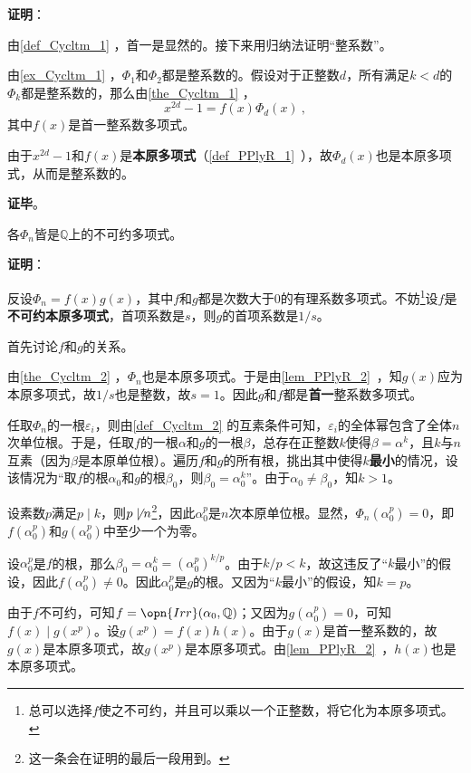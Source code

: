 \textbf{证明}：

由\autoref{def_Cycltm_1} ，首一是显然的。接下来用归纳法证明“整系数”。

由\autoref{ex_Cycltm_1} ，$\Phi_1$和$\Phi_2$都是整系数的。假设对于正整数$d$，所有满足$k<d$的$\Phi_k$都是整系数的，那么由\autoref{the_Cycltm_1} ，
\begin{equation}
x^{2d}-1 = f(x)\Phi_d(x)~,
\end{equation}
其中$f(x)$是首一整系数多项式。

由于$x^{2d}-1$和$f(x)$是\textbf{本原多项式}（\autoref{def_PPlyR_1}~），故$\Phi_d(x)$也是本原多项式，从而是整系数的。

\textbf{证毕}。




\begin{theorem}{}\label{the_Cycltm_5}
各$\Phi_n$皆是$\mathbb{Q}$上的不可约多项式。
\end{theorem}

\textbf{证明}：

反设$\Phi_n=f(x)g(x)$，其中$f$和$g$都是次数大于$0$的有理系数多项式。不妨\footnote{总可以选择$f$使之不可约，并且可以乘以一个正整数，将它化为本原多项式。}设$f$是\textbf{不可约本原多项式}，首项系数是$s$，则$g$的首项系数是$1/s$。

首先讨论$f$和$g$的关系。

由\autoref{the_Cycltm_2} ，$\Phi_n$也是本原多项式。于是由\autoref{lem_PPlyR_2}~，知$g(x)$应为本原多项式，故$1/s$也是整数，故$s=1$。因此$g$和$f$都是\textbf{首一}整系数多项式。

任取$\Phi_n$的一根$\varepsilon_i$，则由\autoref{def_Cycltm_2} 的互素条件可知，$\varepsilon_i$的全体幂包含了全体$n$次单位根。于是，任取$f$的一根$\alpha$和$g$的一根$\beta$，总存在正整数$k$使得$\beta=\alpha^k$，且$k$与$n$互素（因为$\beta$是本原单位根）。遍历$f$和$g$的所有根，挑出其中使得$k$\textbf{最小}的情况，设该情况为“取$f$的根$\alpha_0$和$g$的根$\beta_0$，则$\beta_0=\alpha_0^k$”。由于$\alpha_0\neq \beta_0$，知$k>1$。

设素数$p$满足$p\mid k$，则$p\not\mid n$\footnote{这一条会在证明的最后一段用到。}，因此$\alpha_0^p$是$n$次本原单位根。显然，$\Phi_n(\alpha_0^p)=0$，即$f(\alpha_0^p)$和$g(\alpha_0^p)$中至少一个为零。

设$\alpha_0^p$是$f$的根，那么$\beta_0=\alpha_0^k=(\alpha_0^p)^{k/p}$。由于$k/p<k$，故这违反了“$k$最小”的假设，因此$f(\alpha_0^p)\neq 0$。因此$\alpha_0^p$是$g$的根。又因为“$k$最小”的假设，知$k=p$。

由于$f$不可约，可知$f=\opn{Irr}(\alpha_0, \mathbb{Q})$；又因为$g(\alpha_0^p)=0$，可知$f(x)\mid g(x^p)$。设$g(x^p)=f(x)h(x)$。由于$g(x)$是首一整系数的，故$g(x)$是本原多项式，故$g(x^p)$是本原多项式。由\autoref{lem_PPlyR_2}~，$h(x)$也是本原多项式。

